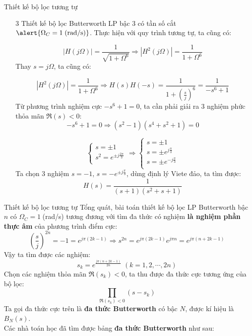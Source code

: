 \documentclass[8pt]{beamer}
\begin{document}
\begin{frame}{Thiết kế bộ lọc tương tự}

	\begin{enumerate}
		\item[3] Thiết kế bộ lọc Butterworth LP bậc 3 có tần số cắt $\alert{\Omega_{C}=1\;\text{(rad/s)}}$.  Thực hiện với quy trình tương tự, ta cũng có:

$$|H(j\Omega)|=\frac{1}{\sqrt{1+\Omega^6}}\Rightarrow |H^2(j\Omega)|=\frac{1}{1+\Omega^6}$$
Thay $s=j\Omega$, ta cũng có:

$$|H^2(j\Omega)|=\frac{1}{1+\Omega^6}\Rightarrow H(s)H(-s)=\frac{1}{1+\left(\frac{s}{j}\right)^6}=\frac{1}{-s^6+1}$$
Từ phương trình nghiệm cực $-s^6+1=0$, ta cần phải giải ra $3$ nghiệm phức thỏa mãn $\Re{(s)}<0$:
$$-s^6+1=0\Rightarrow(s^2-1)(s^4+s^2+1)=0$$

\begin{equation*}
\begin{cases}
s=\pm 1\\
s^2=e^{\pm j\frac{2\pi}{3}}\\
\end{cases}
\Rightarrow
\begin{cases}
	s=\pm 1\\
	s=\pm e^{j\frac{\pi}{3}}\\
	s=\pm e^{-j\frac{\pi}{3}}\\
\end{cases}
\end{equation*}
Ta chọn 3 nghiệm $s=-1$, $s=-e^{\pm j\frac{\pi}{3}}$, dùng định lý Viete đảo, ta tìm được:
$$H(s)=\frac{1}{(s+1)(s^2+s+1)}$$
\end{enumerate}
\end{frame}
\begin{frame}{Thiết kế bộ lọc tương tự}
Tổng quát, bài toán thiết kế bộ lọc LP Butterworth bậc $n$ có $\Omega_{C}=1\;$(rad/s) tương đương với tìm đa thức có nghiệm \textbf{là nghiệm phần thực âm} của phương trình điểm cực:
$$\left(\frac{s}{j}\right)^{2n}=-1=e^{j\pi(2k-1)}\Rightarrow s^{2n}=e^{j\pi(2k-1)}e^{j\pi n}=e^{j\pi(n+2k-1)}$$
Vậy ta tìm được các nghiệm: $$s_{k}=e^{\frac{j\pi(n+2k-1)}{2n}}\;(k=1,2,\cdots,2n)$$
Chọn các nghiệm thỏa mãn $\Re{(s_{k})}<0$, ta thu được đa thức cực tương ứng của bộ lọc: $$\prod_{\Re{(s_{k})}<0}(s-s_{k})$$
Ta gọi đa thức cực trên là \textbf{đa thức Butterworth} có bậc $N$, được kí hiệu là $B_{N}(s)$.
\\ Các nhà toán học đã tìm được bảng \textbf{đa thức Butterworth} như sau:
\end{frame}
\end{document}
